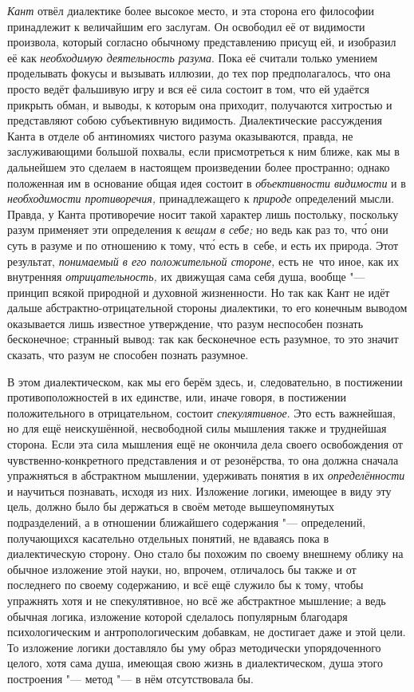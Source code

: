 {\em Кант} отвёл диалектике более высокое место, и эта
сторона его философии принадлежит к величайшим его заслугам. Он освободил
её от видимости произвола, который согласно обычному представлению присущ
ей, и изобразил её как {\em необходимую деятельность разума}.
Пока её считали только умением проделывать фокусы и
вызывать иллюзии, до тех пор предполагалось, что она просто ведёт фальшивую
игру и вся её сила состоит в том, что ей удаётся прикрыть обман, и выводы,
к которым она приходит, получаются хитростью и представляют собою
субъективную видимость. Диалектические рассуждения Канта в отделе об
антиномиях чистого разума оказываются, правда, не заслуживающими большой
похвалы, если присмотреться к ним ближе, как мы в дальнейшем это сделаем в
настоящем произведении более пространно; однако положенная им в основание
общая идея состоит в {\em объективности видимости} и в
{\em необходимости противоречия,} принадлежащего к {\em природе}
определений мысли.
Правда, у Канта противоречие носит такой характер лишь постольку, поскольку
разум применяет эти определения к {\em вещам в себе;}
но ведь как раз то, чт\'{о} они суть в разуме и по отношению к тому,
чт\'{о} есть в~себе, и есть их природа. Этот результат,
{\em понимаемый в его положительной стороне,} есть не~что иное,
как их внутренняя {\em отрицательность,} их
движущая сама себя душа, вообще "--- принцип всякой природной и духовной
жизненности. Но так как Кант не идёт дальше абстрактно-отрицательной
стороны диалектики, то его конечным выводом оказывается лишь известное
утверждение, что разум неспособен познать бесконечное; странный вывод: так
как бесконечное есть разумное, то это значит сказать, что разум не способен
познать разумное.

В этом диалектическом, как мы его берём здесь, и, следовательно, в
постижении противоположностей в их единстве, или, иначе говоря, в
постижении положительного в отрицательном, состоит
{\em спекулятивное}. Это есть важнейшая, но для ещё
неискушённой, несвободной силы мышления также и труднейшая сторона. Если
эта сила мышления ещё не окончила дела своего освобождения от
чувственно-конкретного представления и от резонёрства, то она должна
сначала упражняться в абстрактном мышлении, удерживать понятия в их
{\em определённости} и научиться познавать, исходя из
них. Изложение логики, имеющее в виду эту цель, должно было бы держаться в
своём методе вышеупомянутых подразделений, а в отношении ближайшего
содержания "--- определений, получающихся касательно отдельных понятий, не
вдаваясь пока в диалектическую сторону. Оно стало бы похожим по своему
внешнему облику на обычное изложение этой науки, но, впрочем, отличалось бы
также и от последнего по своему содержанию, и всё ещё служило бы к тому,
чтобы упражнять хотя и не спекулятивное, но всё же абстрактное мышление; а
ведь обычная логика, изложение которой сделалось популярным благодаря
психологическим и антропологическим добавкам, не достигает даже и этой
цели. То изложение логики доставляло бы уму образ методически
упорядоченного целого, хотя сама душа, имеющая свою жизнь в диалектическом,
душа этого построения "--- метод "--- в нём отсутствовала бы.


